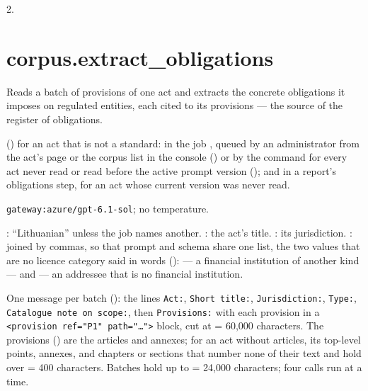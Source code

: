  2.


\section{corpus.extract\_obligations}\label{sec:aprompts:corpus-extract_obligations}

 Reads a batch of provisions of one act and extracts the concrete
obligations it imposes on regulated entities, each cited to its provisions --- the source of
the register of obligations.

  () for an
act that is not a standard: in the job , queued by an
administrator from the act's page or the corpus list in the console
() or by the
command  for every act never read or read before the active prompt
version (); and in a report's obligations step, for an act whose current
version was never read.

 \texttt{gateway:azure/gpt-6.1-sol}; no temperature.

 : \enquote{Lithuanian} unless the job names
another. : the act's title. : its jurisdiction.
:  joined by commas, so that prompt and
schema share one list, the two values that are no licence category said in words
():  --- a financial institution of another kind
--- and  --- an addressee that is no financial institution.

 One message per batch (): the
lines \texttt{Act:}, \texttt{Short title:}, \texttt{Jurisdiction:}, \texttt{Type:},
\texttt{Catalogue note on scope:}, then \texttt{Provisions:} with each provision in a
\texttt{<provision ref="P1" path="…">} block, cut at  = 60{,}000
characters. The provisions () are the articles and annexes; for an act
without articles, its top-level points, annexes, and chapters or sections that number none of
their text and hold over  = 400 characters. Batches hold up to
 = 24{,}000 characters; four calls run at a time.


